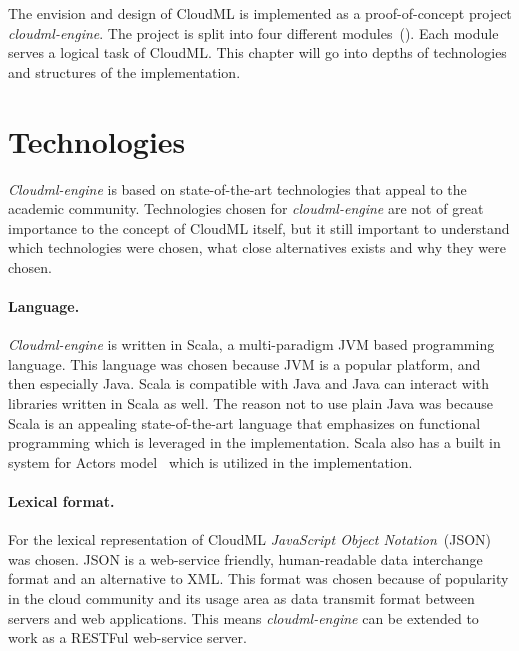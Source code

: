 




The envision and design of CloudML is implemented as a proof-of-concept project \emph{cloudml-engine}.
The project is split into four different modules~(). 
Each module serves a logical task of CloudML.
This chapter will go into depths of technologies and structures of the implementation.

\section{Technologies}

\emph{Cloudml-engine} is based on state-of-the-art technologies that appeal to the academic community.
Technologies chosen for \emph{cloudml-engine} are not of great importance to the concept of CloudML itself,
but it still important to understand which technologies were chosen, what close alternatives exists
and why they were chosen.

\paragraph{Language.} 
\emph{Cloudml-engine} is written in Scala, a multi-paradigm JVM based programming language.
This language was chosen because JVM is a popular platform, and then especially Java.
Scala is compatible with Java and Java can interact with libraries written in Scala as well.
The reason not to use plain Java was because Scala is an appealing state-of-the-art language that emphasizes 
on functional programming which is leveraged in the implementation.
Scala also has a built in system for Actors model~\cite{actors:haller07} which is utilized in the implementation.

\paragraph{Lexical format.}
For the lexical representation of CloudML \emph{JavaScript Object Notation}~(JSON) was chosen.
JSON is a web-service friendly, human-readable data interchange format and an alternative to XML.
This format was chosen because of popularity in the cloud community 
and its usage area as data transmit format between servers and web applications.
This means \emph{cloudml-engine} can be extended to work as a RESTFul web-service server.


